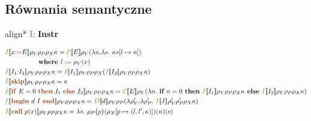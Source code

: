\documentclass{article}
\newcommand{\sembr}[1]{[\![#1]\!]}
\newcommand{\syn}[1]{{\bf \textcolor{RawSienna}{#1}}}
\newcommand{\sem}[1]{{\bf \textcolor{olive}{#1}}}
\newcommand{\semcol}[1]{{\textcolor{olive}{#1}}}
\newcommand{\boxedeq}[1]{\begin{empheq}[box={\fboxsep=6pt\fbox}]{align*}#1\end{empheq}}
\newcommand{\bigeps}{\mathcal{E}}
\begin{document}
\subsection{Równania semantyczne}
\boxedeq{ \semcol{I}: \syn{Instr} \to \sem{INSTR} }
\begin{align*}
	  & \semcol{I}\sembr{x \syn{:=} E} \rho_V \rho_P \rho_X \kappa = \semcol{\bigeps} \sembr{E} \rho_V (\lambda n. \lambda s. \ \kappa s[l\mapsto n])                                                                                                                                                                   \\
	  & \ \ \  \ \ \ \ \ \ \ \ \ \ \ \textbf{ where } l := \rho_V(x)                                                                                                                                                                                                                                                    \\
	  & \semcol{I}\sembr{I_1\syn{;}I_2} \rho_V \rho_P \rho_X \kappa = \semcol{I}\sembr{I_1}\rho_V \rho_P \rho_X (\semcol{I}\sembr{I_2}\rho_V \rho_P \rho_X \kappa)                                                                                                                                                      \\
	  & \semcol{I}\sembr{\syn{skip}} \rho_V \rho_P \rho_X \kappa = \kappa                                                                                                                                                                                                                                               \\
	  & \semcol{I}\sembr{\syn{if} \ E = 0 \ \syn{then} \ I_{1} \ \syn{else} \ I_{2}} \rho_V \rho_P \rho_X \kappa =\semcol{\bigeps} \sembr{E} \rho_V (\lambda n. \ \textbf{if } n = 0 \textbf{ then } \semcol{I}\sembr{I_1}\rho_V \rho_P \rho_X \kappa \textbf{ else } \semcol{I}\sembr{I_2}\rho_V \rho_P \rho_X \kappa) \\
	  & \semcol{I}\sembr{\syn{begin} \ d \ I \ \syn{end}} \rho_V \rho_P \rho_X \kappa = \semcol{D}\sembr{d} \rho_V \rho_P (\lambda \rho'_V. \lambda \rho'_P. \ \semcol{I}\sembr{I} \rho'_V \rho'_P \rho_X \kappa)                                                                                                       \\
	  & \semcol{I}\sembr{\syn{call} \ p(x)} \rho_V \rho_P \rho_X \kappa = \lambda s. \ \rho_P\bigl(p\bigr) (\rho_X[p\mapsto (l, l', \kappa)])(n)(s)                                                                                                                                                                     \\

\end{align*}
\end{document}
